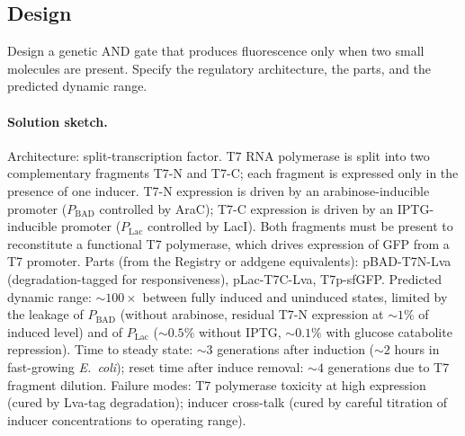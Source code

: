 \subsection*{Design}

\begin{exercise}
Design a genetic AND gate that produces fluorescence only when two
small molecules are present. Specify the regulatory architecture,
the parts, and the predicted dynamic range.

\paragraph{Solution sketch.}
Architecture: split-transcription factor. T7 RNA polymerase is split
into two complementary fragments T7-N and T7-C; each fragment is
expressed only in the presence of one inducer. T7-N expression is
driven by an arabinose-inducible promoter ($P_{\text{BAD}}$
controlled by AraC); T7-C expression is driven by an IPTG-inducible
promoter ($P_{\text{Lac}}$ controlled by LacI). Both fragments must
be present to reconstitute a functional T7 polymerase, which drives
expression of GFP from a T7 promoter. Parts (from the Registry or
addgene equivalents): pBAD-T7N-Lva (degradation-tagged for
responsiveness), pLac-T7C-Lva, T7p-sfGFP. Predicted dynamic range:
$\sim 100\times$ between fully induced and uninduced states, limited
by the leakage of $P_{\text{BAD}}$ (without arabinose, residual
T7-N expression at $\sim 1\%$ of induced level) and of
$P_{\text{Lac}}$ ($\sim 0.5\%$ without IPTG, $\sim 0.1\%$ with
glucose catabolite repression). Time to steady state: $\sim 3$
generations after induction ($\sim 2$ hours in fast-growing
\emph{E.\ coli}); reset time after induce removal: $\sim 4$
generations due to T7 fragment dilution. Failure modes: T7 polymerase
toxicity at high expression (cured by Lva-tag degradation);
inducer cross-talk (cured by careful titration of inducer
concentrations to operating range).
\end{exercise}

